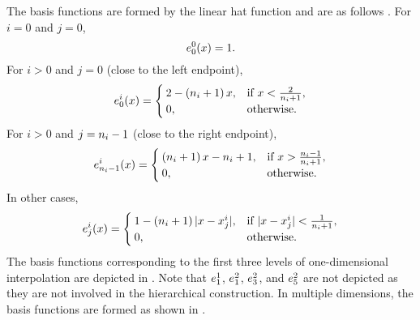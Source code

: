 
The basis functions are formed by the linear hat function and are as follows
\cite{klimke2006}. For $i = 0$ and $j = 0$,
\[
  e^0_0(x) = 1.
\]
For $i > 0$ and $j = 0$ (close to the left endpoint),
\[
  e^i_0(x) = \begin{cases}
    2 - \left( n_i + 1 \right) x, & \text{if } x < \frac{2}{n_i + 1}, \\
    0, & \text{otherwise}.
  \end{cases}
\]
For $i > 0$ and $j = n_i - 1$ (close to the right endpoint),
\[
  e^i_{n_i - 1}(x) = \begin{cases}
    \left( n_i + 1 \right) x - n_i + 1, & \text{if } x > \frac{n_i - 1}{n_i + 1}, \\
    0, & \text{otherwise}.
  \end{cases}
\]
In other cases,
\[
  e^i_j(x) = \begin{cases}
    1 - \left( n_i + 1 \right)|x - x^i_j|, & \text{if } |x - x^i_j| < \frac{1}{n_i + 1}, \\
    0, & \text{otherwise}.
  \end{cases}
\]
The basis functions corresponding to the first three levels of one-dimensional
interpolation are depicted in . Note that $e^1_1$, $e^2_1$,
$e^2_3$, and $e^2_5$ are not depicted as they are not involved in the
hierarchical construction. In multiple dimensions, the basis functions are
formed as shown in .
